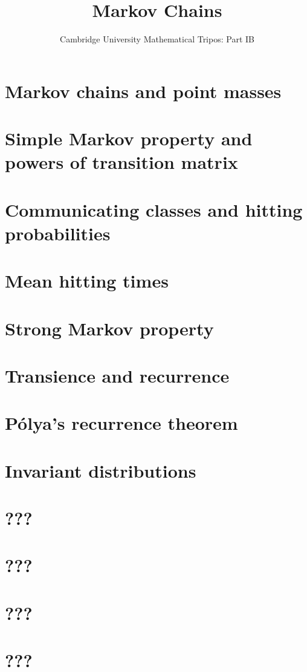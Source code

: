 \documentclass{article}
\title{Markov Chains}
\author{Cambridge University Mathematical Tripos: Part IB}
\begin{document}
\maketitle

\tableofcontentsnewpage{}

\section{Markov chains and point masses}

\section{Simple Markov property and powers of transition matrix}

\section{Communicating classes and hitting probabilities}

\section{Mean hitting times}

\section{Strong Markov property}

\section{Transience and recurrence}

\section{P\'olya's recurrence theorem}

\section{Invariant distributions}

\section{???}

\section{???}

\section{???}

\section{???}

\end{document}
